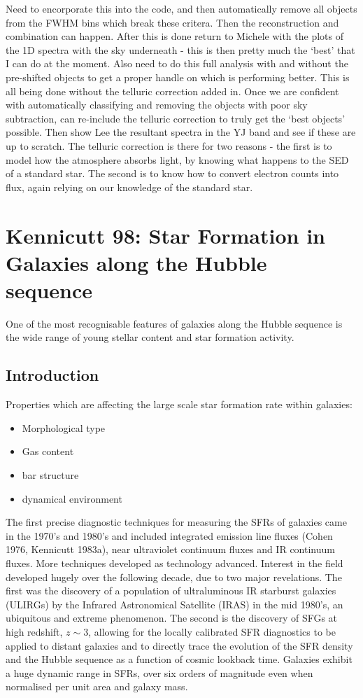 \documentclass{literature}
\begin{document}
Need to encorporate this into the code, and then automatically remove all objects from the FWHM bins which break these critera. Then the reconstruction and combination can happen. After this is done return to Michele with the plots of the 1D spectra with the sky underneath - this is then pretty much the `best' that I can do at the moment. Also need to do this full analysis with and without the pre-shifted objects to get a proper handle on which is performing better. This is all being done without the telluric correction added in. Once we are confident with automatically classifying and removing the objects with poor sky subtraction, can re-include the telluric correction to truly get the `best objects' possible. Then show Lee the resultant spectra in the YJ band and see if these are up to scratch. The telluric correction is there for two reasons - the first is to model how the atmosphere absorbs light, by knowing what happens to the SED of a standard star. The second is to know how to convert electron counts into flux, again relying on our knowledge of the standard star. 



\section{Kennicutt 98: Star Formation in Galaxies along the Hubble sequence}
One of the most recognisable features of galaxies along the Hubble sequence is the wide range of young stellar content and star formation activity. 
\subsection{Introduction}
Properties which are affecting the large scale star formation rate within galaxies: 
\begin{itemize}
\item Morphological type 
\item Gas content 
\item bar structure 
\item dynamical environment
\end{itemize}

The first precise diagnostic techniques for measuring the SFRs of galaxies came in the 1970's and 1980's and included integrated emission line fluxes (Cohen 1976, Kennicutt 1983a), near ultraviolet continuum fluxes and IR continuum fluxes. More techniques developed as technology advanced. Interest in the field developed hugely over the following decade, due to two major revelations. The first was the discovery of a population of ultraluminous IR starburst galaxies (ULIRGs) by the Infrared Astronomical Satellite (IRAS) in the mid 1980's, an ubiquitous and extreme phenomenon. The second is the discovery of SFGs at high redshift, $z \sim 3$, allowing for the locally calibrated SFR diagnostics to be applied to distant galaxies and to directly trace the evolution of the SFR density and the Hubble sequence as a function of cosmic lookback time. Galaxies exhibit a huge dynamic range in SFRs, over six orders of magnitude even when normalised per unit area and galaxy mass.
\end{document}
